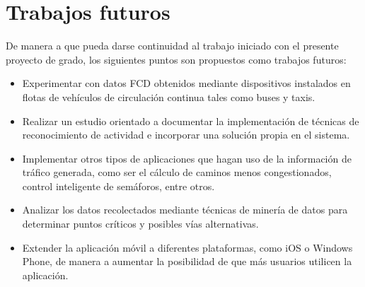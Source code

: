 \section{Trabajos futuros}

De manera a que pueda darse continuidad al trabajo iniciado con el presente proyecto de grado, los siguientes puntos son propuestos como trabajos futuros:

\begin{itemize}

\item Experimentar con datos FCD obtenidos mediante dispositivos  instalados en flotas de vehículos de circulación continua tales como buses y taxis.

\item Realizar un estudio orientado a documentar la implementación de técnicas de reconocimiento de actividad e incorporar una solución propia en el sistema.

\item Implementar otros tipos de aplicaciones que hagan uso de la información de tráfico generada, como ser el cálculo de caminos menos congestionados, control inteligente de semáforos, entre otros.

\item Analizar los datos recolectados mediante técnicas de minería de datos para determinar puntos críticos y posibles vías alternativas.

\item Extender la aplicación móvil a diferentes plataformas, como iOS o Windows Phone, de manera a aumentar la posibilidad de que más usuarios utilicen la aplicación.

\end{itemize}

